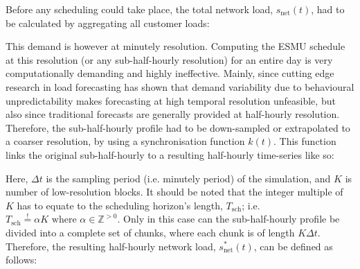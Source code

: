 
Before any scheduling could take place, the total network load, $s_\text{net}(t)$, had to be calculated by aggregating all customer loads:



This demand is however at minutely resolution.
Computing the ESMU schedule at this resolution (or any sub-half-hourly resolution) for an entire day is very computationally demanding and highly ineffective.
Mainly, since cutting edge research in load forecasting has shown that demand variability due to behavioural unpredictability makes forecasting at high temporal resolution unfeasible, but also since traditional forecasts are generally provided at half-hourly resolution.
Therefore, the sub-half-hourly profile had to be down-sampled or extrapolated to a coarser resolution, by using a synchronisation function $k(t)$.
This function links the original sub-half-hourly to a resulting half-hourly time-series like so:




Here, $\Delta t$ is the sampling period (i.e. minutely period) of the simulation, and $K$ is number of low-resolution blocks.
It should be noted that the integer multiple of $K$ has to equate to the scheduling horizon's length, $T_\text{sch}$; i.e. $T_\text{sch} \overset{!}{=} \alpha K \text{ where } \alpha \in \mathbb{Z}^{>0}$.
Only in this case can the sub-half-hourly profile be divided into a complete set of chunks, where each chunk is of length $K\Delta t$.
Therefore, the resulting half-hourly network load, $s^{*}_\text{net}(t)$, can be defined as follows:

